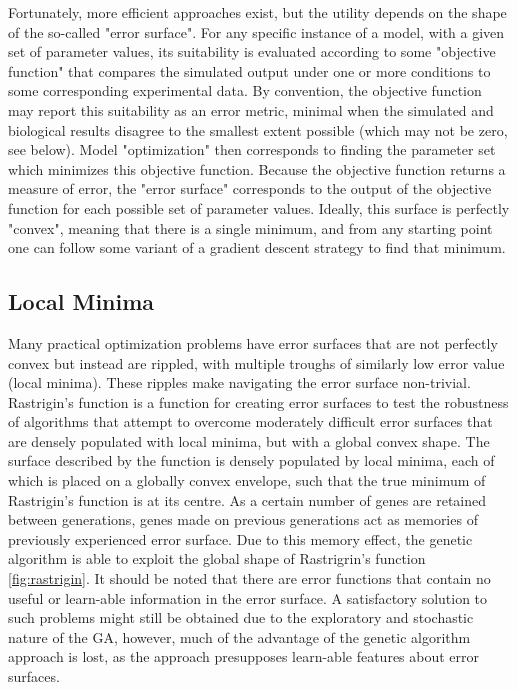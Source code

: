 Fortunately, more efficient approaches exist, but the utility depends on the shape of the so-called "error surface".
For any specific instance of a model, with a given set of parameter values, its suitability is evaluated according to some "objective function" that compares the simulated output under one or more conditions to some corresponding experimental data.
By convention, the objective function may report this suitability as an error metric, minimal when the simulated and biological results disagree to the smallest extent possible (which may not be zero, see below).
Model "optimization" then corresponds to finding the parameter set which minimizes this objective function. 
Because the objective function returns a measure of error, the "error surface" corresponds to the output of the objective function for each possible set of parameter values.
Ideally, this surface is perfectly "convex", meaning that there is a single minimum, and from any starting point one can follow some variant of a gradient descent strategy to find that minimum.  

\subsection{Local Minima} Many practical optimization problems have error surfaces that are not perfectly convex but instead are rippled, with multiple troughs of similarly low error value (local minima).
These ripples make navigating the error surface non-trivial.
Rastrigin's function \cite{rastrigin1974systems}  is a function for creating error surfaces to test the robustness of algorithms that attempt to overcome moderately difficult error surfaces that are densely populated with local minima, but with a global convex shape.
The surface described by the function is densely populated by local minima, each of which is placed on a globally convex envelope, such that the true minimum of Rastrigin's function is at its centre. As a certain number of genes are retained between generations, genes made on previous generations act as memories of previously experienced error surface. Due to this memory effect, the genetic algorithm is able to exploit the global shape of Rastrigrin's function \ref{fig:rastrigin}. It should be noted that there are error functions that contain no useful or learn-able information in the error surface. A satisfactory solution to such problems might still be obtained due to the exploratory and stochastic nature of the GA, however, much of the advantage of the genetic algorithm approach is lost, as the approach presupposes learn-able features about error surfaces. 

